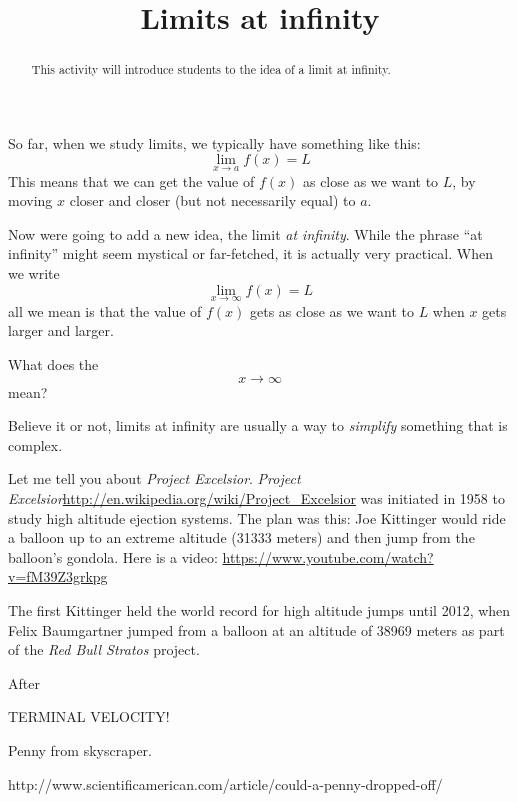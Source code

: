 \documentclass{ximera}
\title{Limits at infinity}
\begin{document}
\begin{abstract}
  This activity will introduce students to the idea of a limit at infinity.
\end{abstract}
\maketitle

So far, when we study limits, we typically have something like this:
\[
\lim_{x\to a} f(x) = L
\]
This means that we can get the value of $f(x)$ as close as we want to
$L$, by moving $x$ closer and closer (but not necessarily equal) to $a$. 

Now were going to add a new idea, the limit \textit{at
  infinity}. While the phrase ``at infinity'' might seem mystical or
far-fetched, it is actually very practical. When we write
\[
\lim_{x\to \infty} f(x) = L
\]
all we mean is that the value of $f(x)$ gets as close as we want to
$L$ when $x$ gets larger and larger. 

\begin{question}
What does the 
\[
x\to \infty
\]
mean?
\begin{solution}
\begin{multiple-choice}
\end{multiple-choice}
\end{solution}
\end{question}


Believe it or not, limits at infinity are usually a way to
\textit{simplify} something that is complex.

Let me tell you about \textit{Project Excelsior}. \textit{Project
  Excelsior}\url{http://en.wikipedia.org/wiki/Project_Excelsior} was
initiated in 1958 to study high altitude ejection systems. The plan
was this: Joe Kittinger would ride a balloon up to an extreme altitude
(31333 meters) and then jump from the balloon's gondola. Here is a
video: \url{https://www.youtube.com/watch?v=fM39Z3grkpg}


The first 
Kittinger held the world record for high altitude jumps until 2012,
when Felix Baumgartner jumped from a balloon at an altitude of 38969
meters as part of the \textit{Red Bull Stratos} project.

After 


TERMINAL VELOCITY!


Penny from skyscraper. 

http://www.scientificamerican.com/article/could-a-penny-dropped-off/
\end{document}
